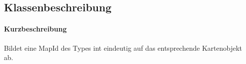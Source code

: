 \subsection{Klassenbeschreibung}%
\paragraph*{Kurzbeschreibung}
    Bildet eine MapId des Types int eindeutig auf das entsprechende Kartenobjekt ab.
